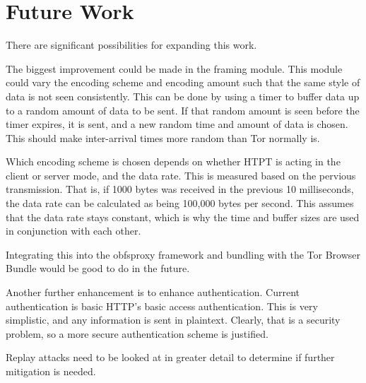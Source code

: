 \section{Future Work}

There are significant possibilities for expanding this work. 

The biggest improvement could be made in the framing module.  This module could vary the encoding scheme and encoding amount such that the same style of data is not seen consistently. This can be done by using a timer to buffer data up to a random amount of data to be sent. If that random amount is seen before the timer expires, it is sent, and a new random time and amount of data is chosen. This should make inter-arrival times more random than Tor normally is. 

Which encoding scheme is chosen depends on whether HTPT is acting in the client or server mode, and the data rate. This is measured based on the pervious transmission. That is, if 1000 bytes was received in the previous 10 milliseconds, the data rate can be calculated as being 100,000 bytes per second. This assumes that the data rate stays constant, which is why the time and buffer sizes are used in conjunction with each other.

Integrating this into the obfsproxy framework and bundling with the Tor Browser Bundle would be good to do in the future.

Another further enhancement is to enhance authentication. Current authentication is basic HTTP's basic access authentication. This is very simplistic, and any information is sent in plaintext. Clearly, that is a security problem, so a more secure authentication scheme is justified.

Replay attacks need to be looked at in greater detail to determine if further mitigation is needed.

